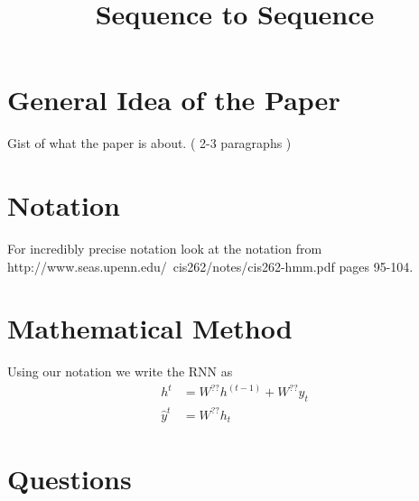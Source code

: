 \documentclass{article}
\title{Sequence to Sequence}
\begin{document}
\maketitle

\section{General Idea of the Paper}

Gist of what the paper is about. ( 2-3 paragraphs )

\section{Notation}
For incredibly precise notation look at the notation from http://www.seas.upenn.edu/~cis262/notes/cis262-hmm.pdf pages 95-104. 

\section{Mathematical Method}

Using our notation we write the RNN as
\begin{align*}
    h^t &= W^{??}h^{(t-1)} + W^{??}y_t \\
    \hat{y}^t &= W^{??}h_t 
\end{align*}

\section{Questions}
\end{document}
